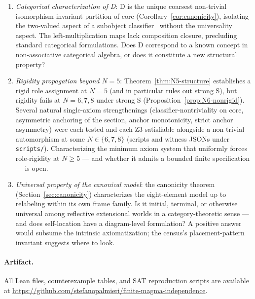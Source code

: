 \documentclass[sigconf,screen]{acmart}
\theoremstyle{remark}
\begin{document}
\begin{enumerate}
  \item \emph{Categorical characterization of D}: D is the unique coarsest non-trivial isomorphism-invariant partition of core (Corollary~\ref{cor:canonicity}), isolating the two-valued aspect of a subobject classifier~\cite{johnstone02} without the universality aspect. The left-multiplication maps lack composition closure, precluding standard categorical formulations. Does D correspond to a known concept in non-associative categorical algebra, or does it constitute a new structural property?
  \item \emph{Rigidity propagation beyond $N\!=\!5$}: Theorem~\ref{thm:N5-structure} establishes a rigid role assignment at $N\!=\!5$ (and in particular rules out strong S), but rigidity fails at $N\!=\!6, 7, 8$ under strong S (Proposition~\ref{prop:N6-nonrigid}). Several natural single-axiom strengthenings (classifier-nontriviality on core, asymmetric anchoring of the section, anchor monotonicity, strict anchor asymmetry) were each tested and each Z3-satisfiable alongside a non-trivial automorphism at some $N \in \{6, 7, 8\}$ (scripts and witness JSONs under \texttt{scripts/}). Characterizing the minimum axiom system that uniformly forces role-rigidity at $N \geq 5$ --- and whether it admits a bounded finite specification --- is open.
  \item \emph{Universal property of the canonical model}: the canonicity theorem (Section~\ref{sec:canonicity}) characterizes the eight-element model up to relabeling within its own frame family. Is it initial, terminal, or otherwise universal among reflective extensional worlds in a category-theoretic sense --- and does self-location have a diagram-level formulation? A positive answer would subsume the intrinsic axiomatization; the census's placement-pattern invariant suggests where to look.
\end{enumerate}

\paragraph{Artifact.}
All Lean files, counterexample tables, and SAT reproduction scripts are available at \url{https://github.com/stefanopalmieri/finite-magma-independence}.

\end{document}
